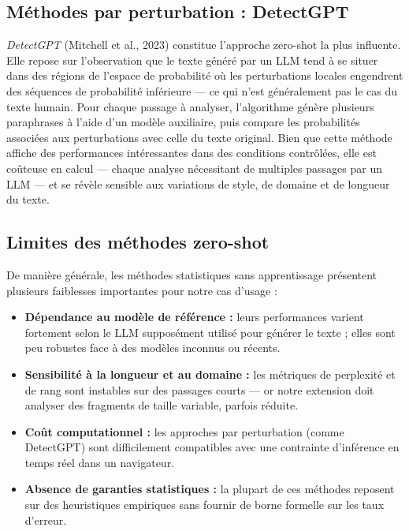 ﻿\documentclass[12pt, a4paper]{report}
\begin{document}
\subsection{Méthodes par perturbation : DetectGPT}

\textit{DetectGPT} (Mitchell et al., 2023) constitue l'approche zero-shot la plus 
influente. Elle repose sur l'observation que le texte généré par un LLM tend à se 
situer dans des régions de l'espace de probabilité où les perturbations locales 
engendrent des séquences de probabilité inférieure — ce qui n'est généralement pas 
le cas du texte humain. Pour chaque passage à analyser, l'algorithme génère 
plusieurs paraphrases à l'aide d'un modèle auxiliaire, puis compare les probabilités 
associées aux perturbations avec celle du texte original. Bien que cette méthode 
affiche des performances intéressantes dans des conditions contrôlées, elle est 
coûteuse en calcul — chaque analyse nécessitant de multiples passages par un 
LLM — et se révèle sensible aux variations de style, de domaine et de longueur du 
texte.

\subsection{Limites des méthodes zero-shot}

De manière générale, les méthodes statistiques sans apprentissage présentent 
plusieurs faiblesses importantes pour notre cas d'usage :

\begin{itemize}
  \item \textbf{Dépendance au modèle de référence :} leurs performances varient 
        fortement selon le LLM supposément utilisé pour générer le texte ; elles 
        sont peu robustes face à des modèles inconnus ou récents.
  \item \textbf{Sensibilité à la longueur et au domaine :} les métriques de 
        perplexité et de rang sont instables sur des passages courts — or notre 
        extension doit analyser des fragments de taille variable, parfois réduite.
  \item \textbf{Coût computationnel :} les approches par perturbation (comme 
        DetectGPT) sont difficilement compatibles avec une contrainte d'inférence 
        en temps réel dans un navigateur.
  \item \textbf{Absence de garanties statistiques :} la plupart de ces méthodes 
        reposent sur des heuristiques empiriques sans fournir de borne formelle 
        sur les taux d'erreur.
\end{itemize}
\end{document}
